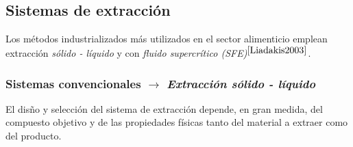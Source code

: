 \subsection{Sistemas de extracci\'on}

\noindent
\justify

Los m\'etodos industrializados m\'as utilizados en el sector alimenticio emplean extracci\'on \textit{s\'olido - l\'iquido} y con \textit{fluido supercr\'itico (SFE)}$^{\cite{Liadakis2003}}$. 

\subsubsection{Sistemas convencionales $\rightarrow$ \textit{Extracci\'on s\'olido - l\'iquido}}

\noindent
\justify

El dis\~no y selecci\'on del sistema de extracci\'on depende, en gran medida, del compuesto objetivo y de las propiedades f\'isicas tanto del material a extraer como del producto. 

